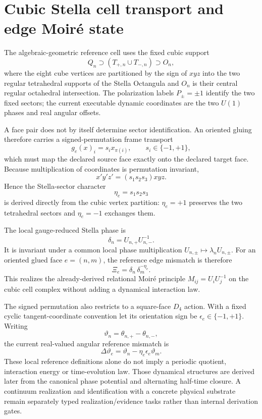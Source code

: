 \documentclass[11pt]{article}
\begin{document}
\section{Cubic Stella cell transport and edge Moir\'e state}

The algebraic-geometric reference cell uses the fixed cubic support
\[
Q_n\supset(T_{+,n}\cup T_{-,n})\supset O_n,
\]
where the eight cube vertices are partitioned by the sign of \(xyz\) into the
two regular tetrahedral supports of the Stella Octangula and \(O_n\) is their
central regular octahedral intersection. The polarization labels
\(P_\pm=\pm1\) identify the two fixed sectors; the current executable dynamic
coordinates are the two \(U(1)\) phases and real angular offsets.

A face pair does not by itself determine sector identification. An oriented
gluing therefore carries a signed-permutation frame transport
\[
g_e(x)_i=s_i x_{\pi(i)},\qquad s_i\in\{-1,+1\},
\]
which must map the declared source face exactly onto the declared target face.
Because multiplication of coordinates is permutation invariant,
\[
x'y'z'=(s_1s_2s_3)xyz.
\]
Hence the Stella-sector character
\[
\boxed{\eta_e=s_1s_2s_3}
\]
is derived directly from the cubic vertex partition: \(\eta_e=+1\) preserves
the two tetrahedral sectors and \(\eta_e=-1\) exchanges them.

The local gauge-reduced Stella phase is
\[
\boxed{\delta_n=U_{n,+}U_{n,-}^{-1}}.
\]
It is invariant under a common local phase multiplication
\(U_{n,\pm}\mapsto\lambda_nU_{n,\pm}\). For an oriented glued face
\(e=(n,m)\), the reference edge mismatch is therefore
\[
\boxed{\Xi_e=\delta_n\,\delta_m^{-\eta_e}}.
\]
This realizes the already-derived relational Moir\'e principle
\(M_{ij}=U_iU_j^{-1}\) on the cubic cell complex without adding a dynamical
interaction law.

The signed permutation also restricts to a square-face \(D_4\) action. With a
fixed cyclic tangent-coordinate convention let its orientation sign be
\(\epsilon_e\in\{-1,+1\}\). Writing
\[
\vartheta_n=\theta_{n,+}-\theta_{n,-},
\]
the current real-valued angular reference mismatch is
\[
\Delta\vartheta_e
=
\vartheta_n-\eta_e\epsilon_e\vartheta_m.
\]
These local reference definitions alone do not imply a periodic quotient,
interaction energy or time-evolution law. Those dynamical structures are
derived later from the canonical phase potential and alternating half-time
closure. A continuum realization and identification with a concrete physical
substrate remain separately typed realization/evidence tasks rather than
internal derivation gates.
\end{document}
